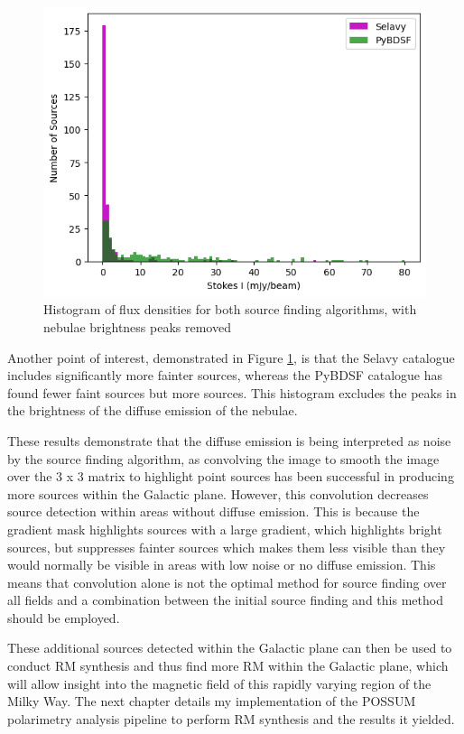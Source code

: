\begin{figure}
    \centering
    \includegraphics[width=\linewidth]{Thesis_Template/Figures/unmatched histogram.png}
    \caption[Histogram of flux densities for both source finding algorithms]{Histogram of flux densities for both source finding algorithms, with nebulae brightness peaks removed}
    \label{fig: unmatched histogram}
\end{figure}

Another point of interest, demonstrated in Figure \ref{fig: unmatched histogram}, is that the Selavy catalogue includes significantly more fainter sources, whereas the PyBDSF catalogue has found fewer faint sources but more sources. This histogram excludes the peaks in the brightness of the diffuse emission of the nebulae.

These results demonstrate that the diffuse emission is being interpreted as noise by the source finding algorithm, as convolving the image to smooth the image over the 3 x 3 matrix to highlight point sources has been successful in producing more sources within the Galactic plane. However, this convolution decreases source detection within areas without diffuse emission. This is because the gradient mask highlights sources with a large gradient, which highlights bright sources, but suppresses fainter sources which makes them less visible than they would normally be visible in areas with low noise or no diffuse emission. This means that convolution alone is not the optimal method for source finding over all fields and a combination between the initial source finding and this method should be employed.

These additional sources detected within the Galactic plane can then be used to conduct RM synthesis and thus find more RM within the Galactic plane, which will allow insight into the magnetic field of this rapidly varying region of the Milky Way. The next chapter details my implementation of the POSSUM polarimetry analysis pipeline to perform RM synthesis and the results it yielded.